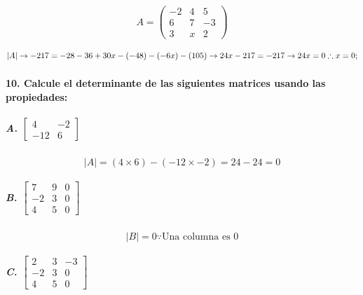 \documentclass[
]{article}
\begin{document}
\[
A = \begin{pmatrix}
    -2 & 4 & 5 \\
    6 & 7 & -3 \\
    3 & x & 2
\end{pmatrix}
\]

\[
|A| \rightarrow -217 = -28 - 36 + 30x - (-48) - (-6x) - (105) \rightarrow 24x - 217 = -217 \rightarrow 24x = 0 \\\therefore\\ x = 0;
\]

\hypertarget{calcule-el-determinante-de-las-siguientes-matrices-usando-las-propiedades}{%
\paragraph{10. Calcule el determinante de las siguientes matrices usando
las
propiedades:}\label{calcule-el-determinante-de-las-siguientes-matrices-usando-las-propiedades}}

\hypertarget{a.-beginbmatrix4--2--12-6endbmatrix}{%
\subparagraph{\texorpdfstring{A.
\(\begin{bmatrix}4 & -2 \\ -12 & 6\end{bmatrix}\)}{A. \textbackslash begin\{bmatrix\}4 \& -2 \textbackslash\textbackslash{} -12 \& 6\textbackslash end\{bmatrix\}}}\label{a.-beginbmatrix4--2--12-6endbmatrix}}

\[
|A| = (4\times6) - (-12\times -2) = 24-24 = 0
\]

\hypertarget{b.-beginbmatrix7-9-0-230450endbmatrix}{%
\subparagraph{\texorpdfstring{B.
\(\begin{bmatrix}7 & 9& 0\\-2&3&0\\4&5&0\end{bmatrix}\)}{B. \textbackslash begin\{bmatrix\}7 \& 9\& 0\textbackslash\textbackslash-2\&3\&0\textbackslash\textbackslash4\&5\&0\textbackslash end\{bmatrix\}}}\label{b.-beginbmatrix7-9-0-230450endbmatrix}}

\[
|B| = 0 \because \text{Una columna es 0}
\]

\hypertarget{c.-beginbmatrix23-3-230450endbmatrix}{%
\subparagraph{\texorpdfstring{C.
\(\begin{bmatrix}2&3&-3\\-2&3&0\\4&5&0\end{bmatrix}\)}{C. \textbackslash begin\{bmatrix\}2\&3\&-3\textbackslash\textbackslash-2\&3\&0\textbackslash\textbackslash4\&5\&0\textbackslash end\{bmatrix\}}}\label{c.-beginbmatrix23-3-230450endbmatrix}}
\end{document}

